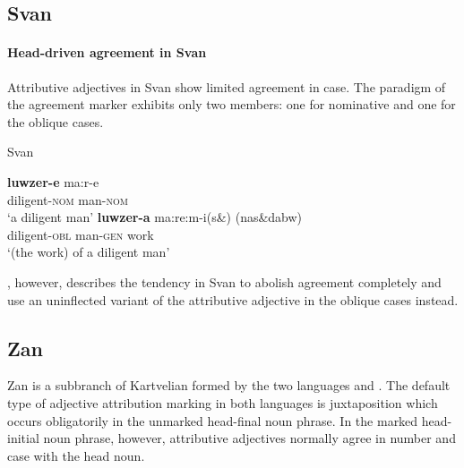 \subsection{Svan}
\paragraph*{Head\hyp{}driven agreement in Svan}
Attributive adjectives in Svan show limited agreement in case. The paradigm of the agreement marker exhibits only two members: one for nominative and one for the oblique cases.
\begin{exe}
\ex \rm{Svan \citep[18]{tuite1997}}
\begin{xlist}
\ex	
\gll 	\textbf{luwzer-e}	ma:r-e\\
	diligent-\textsc{nom} man-\textsc{nom}\\
\glt	‘a diligent man’
\ex	
\gll	\textbf{luwzer-a}	ma:re:m-i(s\&) (nas\&dabw)\\
	diligent-\textsc{obl} man-\textsc{gen} work\\
\glt	‘(the work) of a diligent man’
\end{xlist}
\end{exe}
\citet[499]{schmidt1991}, however, describes the tendency in Svan to abolish agreement completely and use an uninflected variant of the attributive adjective in the oblique cases instead.

\subsection{Zan}
Zan is a subbranch of Kartvelian formed by the two languages  and . The default type of adjective attribution marking in both languages is juxtaposition which occurs obligatorily in the unmarked head-final noun phrase. In the marked head-initial noun phrase, however, attributive adjectives normally agree in number and case with the head noun.

